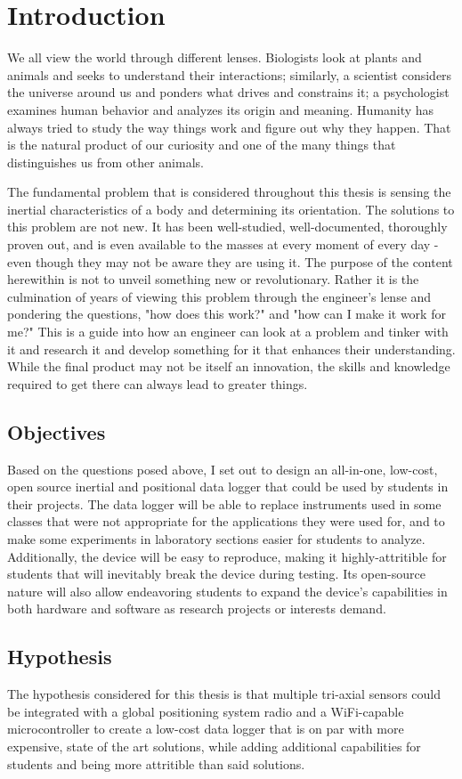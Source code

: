 \chapter{Introduction} 
We all view the world through different lenses.
Biologists look at plants and animals and seeks to understand their interactions;
similarly, a scientist considers the universe around us and ponders what drives and constrains it;
a psychologist examines human behavior and analyzes its origin and meaning.
Humanity has always tried to study the way things work and figure out why they happen.
That is the natural product of our curiosity and one of the many things that distinguishes us from other animals.

The fundamental problem that is considered throughout this thesis is sensing the inertial characteristics of a body and determining its orientation.
The solutions to this problem are not new.
It has been well-studied, well-documented, thoroughly proven out, and is even available to the masses at every moment of every day - even though they may not be aware they are using it.
The purpose of the content herewithin is not to unveil something new or revolutionary.
Rather it is the culmination of years of viewing this problem through the engineer's lense and pondering the questions, "how does this work?" and "how can I make it work for me?"
This is a guide into how an engineer can look at a problem and tinker with it and research it and develop something for it that enhances their understanding.
While the final product may not be itself an innovation, the skills and knowledge required to get there can always lead to greater things.

\section{Objectives} 
Based on the questions posed above, I set out to design an all-in-one, low-cost, open source inertial and positional data logger that could be used by students in their projects.
The data logger will be able to replace instruments used in some classes that were not appropriate for the applications they were used for, and to make some experiments in laboratory sections easier for students to analyze.
Additionally, the device will be easy to reproduce, making it highly-attritible for students that will inevitably break the device during testing.
Its open-source nature will also allow endeavoring students to expand the device's capabilities in both hardware and software as research projects or interests demand.

\section{Hypothesis} 
The hypothesis considered for this thesis is that multiple tri-axial sensors could be integrated with a global positioning system radio and a WiFi-capable microcontroller to create a low-cost data logger that is on par with more expensive, state of the art solutions, while adding additional capabilities for students and being more attritible than said solutions.
